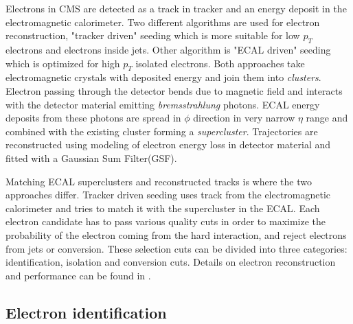 Electrons in CMS are detected as a track in tracker and an energy deposit in the electromagnetic calorimeter. Two different algorithms are used for electron reconstruction, "tracker driven" seeding which is more suitable for low $p_T$ electrons and electrons inside jets. Other algorithm is "ECAL driven" seeding which is optimized for high $p_T$ isolated electrons. Both approaches take electromagnetic crystals with deposited energy and join them into \textit{clusters}. Electron passing through the detector bends due to magnetic field and interacts with the detector material emitting \textit{bremsstrahlung} photons. ECAL energy deposits from these photons are spread in $\phi$ direction in very narrow $\eta$ range and combined with the existing cluster forming a \textit{supercluster}. Trajectories are reconstructed using modeling of electron energy loss in detector material and fitted with a Gaussian Sum Filter(GSF)\cite{2005JPhG31N9A}.
\par Matching ECAL superclusters and reconstructed tracks is where the two approaches differ. Tracker driven seeding uses track from the electromagnetic calorimeter and tries to match it with the supercluster in the ECAL.   
Each electron candidate has to pass various quality cuts in order to maximize the probability of the electron coming from the hard interaction, and reject electrons from jets or conversion. These selection cuts can be divided into three categories: identification, isolation and conversion cuts. Details on electron reconstruction and performance can be found in \cite{CMS:2010bta}.

\subsection{Electron identification}
\label{sec:eleID}


